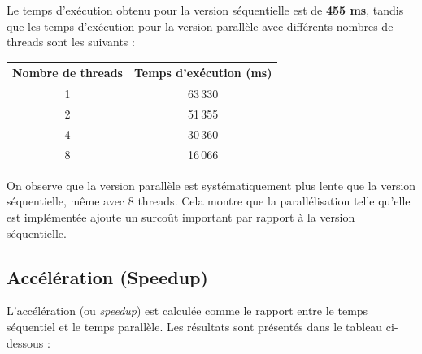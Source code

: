 \documentclass[a4paper,12pt]{article}
\begin{document}
Le temps d'exécution obtenu pour la version séquentielle est de \textbf{455 ms}, tandis que les temps d'exécution pour la version parallèle avec différents nombres de threads sont les suivants :

\begin{center}
\begin{tabular}{|c|c|}
\hline
\textbf{Nombre de threads} & \textbf{Temps d'exécution (ms)} \\
\hline
1 & 63\,330 \\
2 & 51\,355 \\
4 & 30\,360 \\
8 & 16\,066 \\
\hline
\end{tabular}
\end{center}

On observe que la version parallèle est systématiquement plus lente que la version séquentielle, même avec 8 threads. Cela montre que la parallélisation telle qu'elle est implémentée ajoute un surcoût important par rapport à la version séquentielle.

\subsection{Accélération (Speedup)}

L'accélération (ou \emph{speedup}) est calculée comme le rapport entre le temps séquentiel et le temps parallèle. Les résultats sont présentés dans le tableau ci-dessous :
\end{document}
